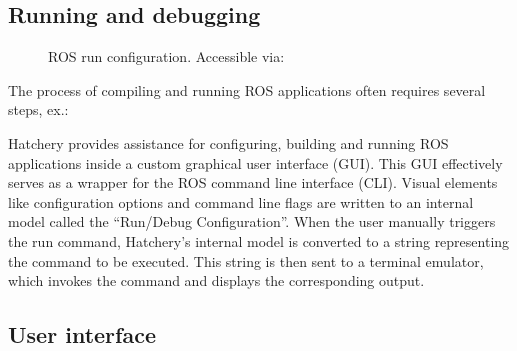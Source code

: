 \documentclass[12pt,initial,twoside,maitrise]{dms}
\numberwithin{equation}{section}
\numberwithin{table}{chapter}
\numberwithin{figure}{chapter}
\begin{document}
\subsection{Running and debugging}

\begin{figure}
    \centering
    \caption{ROS run configuration. Accessible via: }
    \label{fig:ros_run_config}
\end{figure}

The process of compiling and running ROS applications often requires several steps, ex.:
%
%
Hatchery provides assistance for configuring, building and running ROS applications inside a custom graphical user interface (GUI). This GUI effectively serves as a wrapper for the ROS command line interface (CLI). Visual elements like configuration options and command line flags are written to an internal model called the ``Run/Debug Configuration''. When the user manually triggers the run command, Hatchery's internal model is converted to a string representing the command to be executed. This string is then sent to a terminal emulator, which invokes the command and displays the corresponding output.

\subsection{User interface}
\end{document}
